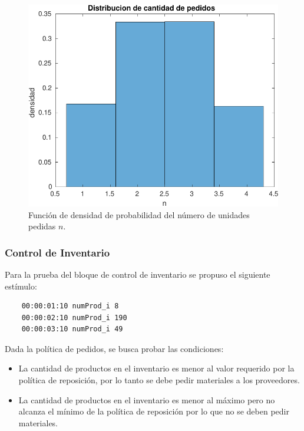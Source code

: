 \documentclass[10pt]{article}
\begin{document}
\begin{figure}
\centering
\includegraphics[scale=1]{img/pdf_cantidad_pedidos}
\caption{Función de densidad de probabilidad del número de unidades pedidas $n$.}
\label{fig:pdfpedidos}
\end{figure}

\subsubsection{Control de Inventario}
Para la prueba del bloque de control de inventario se propuso el siguiente estímulo:

\begin{minipage}{1\textwidth}
	\centering
	\begin{lstlisting}
	00:00:01:10 numProd_i 8
	00:00:02:10 numProd_i 190
	00:00:03:10 numProd_i 49
	\end{lstlisting}
	
	\centering
\end{minipage}

Dada la política de pedidos, se busca probar las condiciones:
\begin{itemize}
\item La cantidad de productos en el inventario es menor al valor requerido por la política de reposición, por lo tanto se debe pedir materiales a los proveedores.
\item  La cantidad de productos en el inventario es menor al máximo pero no alcanza el mínimo de la política de reposición por lo que no se deben pedir materiales.
\end{itemize}
\end{document}
